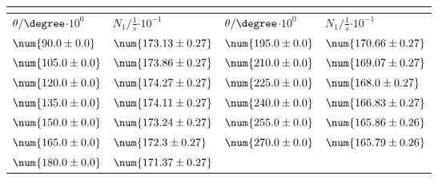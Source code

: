 \begin{tabular}{|p{}|p{}||p{}|p{}|}
\hline
\multicolumn{4}{|c|}{}\\
\hline
$\theta/\degree$$\cdot 10^{0}$&$N_1/\frac{1}{s}$$\cdot 10^{-1}$&$\theta/\degree$$\cdot 10^{0}$&$N_1/\frac{1}{s}$$\cdot 10^{-1}$\\
\hline
$\num{90.0\pm 0.0}$&$\num{173.13\pm 0.27}$&$\num{195.0\pm 0.0}$&$\num{170.66\pm 0.27}$\\
$\num{105.0\pm 0.0}$&$\num{173.86\pm 0.27}$&$\num{210.0\pm 0.0}$&$\num{169.07\pm 0.27}$\\
$\num{120.0\pm 0.0}$&$\num{174.27\pm 0.27}$&$\num{225.0\pm 0.0}$&$\num{168.0\pm 0.27}$\\
$\num{135.0\pm 0.0}$&$\num{174.11\pm 0.27}$&$\num{240.0\pm 0.0}$&$\num{166.83\pm 0.27}$\\
$\num{150.0\pm 0.0}$&$\num{173.24\pm 0.27}$&$\num{255.0\pm 0.0}$&$\num{165.86\pm 0.26}$\\
$\num{165.0\pm 0.0}$&$\num{172.3\pm 0.27}$&$\num{270.0\pm 0.0}$&$\num{165.79\pm 0.26}$\\
$\num{180.0\pm 0.0}$&$\num{171.37\pm 0.27}$&&\\
\hline
\end{tabular}
